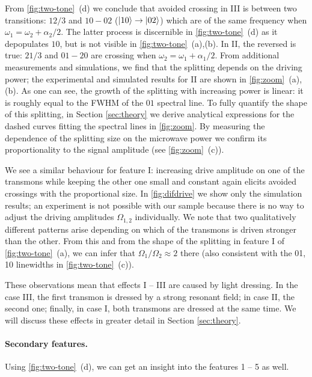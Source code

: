 \documentclass[%
 prx,
 amsmath,amssymb,
 reprint,%
]{revtex4-1}
\begin{document}
From \autoref{fig:two-tone}~(d) we conclude that avoided crossing in III is between two transitions: ${12/3}$ and ${10} - {02}$ ($\ket{10}\rightarrow\ket{02}$) which are of the same frequency when $\omega_1 = \omega_2+\alpha_2/2$. The latter process is discernible in \autoref{fig:two-tone}~(d) as it depopulates ${10}$, but is not visible in \autoref{fig:two-tone}~(a),(b). In II, the reversed is true: ${21/3}$ and ${01} - {20}$ are crossing when $\omega_2 = \omega_1+\alpha_1/2$. From additional measurements and simulations, we find that the splitting depends on the driving power; the experimental and simulated results for II are shown in \autoref{fig:zoom}~(a), (b). As one can see, the growth of the splitting with increasing power is linear: it is roughly equal to the FWHM of the ${01}$ spectral line. To fully quantify the shape of this splitting, in Section \ref{sec:theory} we derive analytical expressions for the dashed curves fitting the spectral lines in \autoref{fig:zoom}. By measuring the dependence of the splitting size on the microwave power we confirm its proportionality to the signal amplitude (see \autoref{fig:zoom}~(c)).

We see a similar behaviour for feature I: increasing drive amplitude on one of the transmons while keeping the other one small and constant again elicits avoided crossings with the proportional size. In \autoref{fig:difdrive} we show only the simulation results; an experiment is not possible with our sample because there is no way to adjust the driving amplitudes $\Omega_{1,2}$ individually. We note that two qualitatively different patterns arise depending on which of the transmons is driven stronger than the other. From this and from the shape of the splitting in feature I of \autoref{fig:two-tone}~(a), we can infer that $\Omega_1/\Omega_2 \approx 2$ there (also consistent with the 01, 10 linewidths in \autoref{fig:two-tone}~(c)).

These observations mean that effects I -- III are caused by light dressing. In the case III, the first transmon is dressed by a strong resonant field; in case II, the second one; finally, in case I, both transmons are dressed at the same time. We will discuss these effects in greater detail in Section \ref{sec:theory}.

\paragraph{Secondary features.} Using \autoref{fig:two-tone}~(d), we can get an insight into the features 1 -- 5 as well. 
\end{document}
